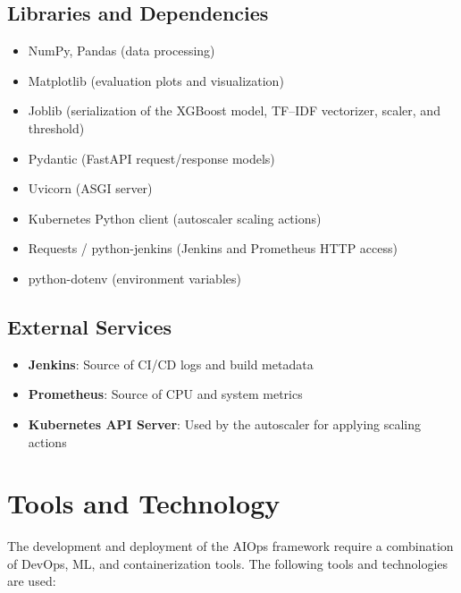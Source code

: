 \documentclass[12pt]{report}
\begin{document}
\subsection*{Libraries and Dependencies}
\begin{itemize}
    \item NumPy, Pandas (data processing)
    \item Matplotlib (evaluation plots and visualization)
    \item Joblib (serialization of the XGBoost model, TF--IDF vectorizer, scaler, and threshold)
    \item Pydantic (FastAPI request/response models)
    \item Uvicorn (ASGI server)
    \item Kubernetes Python client (autoscaler scaling actions)
    \item Requests / python-jenkins (Jenkins and Prometheus HTTP access)
    \item python-dotenv (environment variables)
\end{itemize}

\subsection*{External Services}
\begin{itemize}
    \item \textbf{Jenkins}: Source of CI/CD logs and build metadata
    \item \textbf{Prometheus}: Source of CPU and system metrics
    \item \textbf{Kubernetes API Server}: Used by the autoscaler for applying scaling actions
\end{itemize}

\section{Tools and Technology}

The development and deployment of the AIOps framework require a combination of DevOps, ML, and containerization tools. The following tools and technologies are used:
\end{document}
